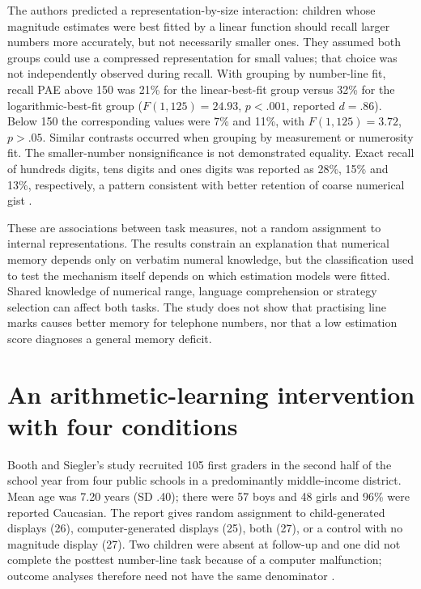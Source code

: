 The authors predicted a representation-by-size interaction:
children whose magnitude estimates were best fitted by a linear
function should recall larger numbers more accurately, but not
necessarily smaller ones. They assumed both groups could use a
compressed representation for small values; that choice was not
independently observed during recall. With grouping by number-line
fit, recall PAE above 150 was 21\% for the linear-best-fit group
versus 32\% for the logarithmic-best-fit group
(\(F(1,125)=24.93\), \(p<.001\), reported \(d=.86\)). Below
150 the corresponding values were 7\% and 11\%, with
\(F(1,125)=3.72\), \(p>.05\). Similar contrasts occurred when
grouping by measurement or numerosity fit. The smaller-number
nonsignificance is not demonstrated equality. Exact recall of
hundreds digits, tens digits and ones digits was reported as 28\%,
15\% and 13\%, respectively, a pattern consistent with better
retention of coarse numerical gist
\cite[pp.~1278--1280 and Table 3]{ThompsonSiegler2010MemoryNL}.

These are associations between task measures, not a random assignment
to internal representations. The results constrain an explanation
that numerical memory depends only on verbatim numeral knowledge,
but the classification used to test the mechanism itself depends on
which estimation models were fitted. Shared knowledge of numerical
range, language comprehension or strategy selection can affect both
tasks. The study does not show that practising line marks causes
better memory for telephone numbers, nor that a low estimation
score diagnoses a general memory deficit.

\section{An arithmetic-learning intervention with four conditions}
\label{sec:p19-nl-arithmetic}

Booth and Siegler's study recruited 105 first graders in the second
half of the school year from four public schools in a predominantly
middle-income district. Mean age was 7.20 years (SD .40); there
were 57 boys and 48 girls and 96\% were reported Caucasian.
The report gives random assignment to child-generated displays
(26), computer-generated displays (25), both (27), or a control
with no magnitude display (27). Two children were absent at follow-up
and one did not complete the posttest number-line task because of
a computer malfunction; outcome analyses therefore need not have
the same denominator \cite[pp.~1019--1020]
{BoothSiegler2008ArithmeticNL}.

